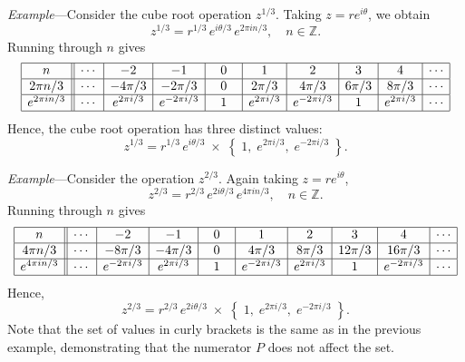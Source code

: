 \documentclass[10pt,a4paper]{article}
\begin{document}
\begin{framed} \noindent
  \textit{Example}---Consider the cube root operation $z^{1/3}$.
  Taking $z = r e^{i\theta}$, we obtain
\begin{equation}
z^{1/3} = r^{1/3} \, e^{i\theta/3} \, e^{2\pi i n/3}, \quad n \in \mathbb{Z}.
\end{equation}
Running through $n$ gives
\begin{align*}
  \begin{array}{|c||c|c|c|c|c|c|c|c|c|} \hline n &\cdots & -2 & -1 & 0 & 1 & 2 & 3 & 4 & \cdots \\ \hline 2\pi n / 3 &\cdots & -4\pi/3 & -2\pi/3 & 0 & 2\pi/3 & 4\pi/3 & 6\pi/3 & 8\pi/3 & \cdots \\ \hline e^{2\pi i n/3} &\cdots & e^{2\pi i /3} & e^{-2\pi i /3} & \;\,\;1\;\,\; & e^{2\pi i /3} & e^{-2\pi i /3} & \;\,\;1\;\,\; & e^{2\pi i /3} & \cdots \\ \hline \end{array}
\end{align*}
Hence, the cube root operation has three distinct values:
\begin{equation}
  z^{1/3} = r^{1/3} \, e^{i\theta/3} \;\times\; \left\{\;
  1, \;e^{2\pi i /3},\; e^{-2\pi i /3}\; \right\}.
\end{equation}
\end{framed}


\begin{framed} \noindent
  \textit{Example}---Consider the operation $z^{2/3}$. Again taking
  $z = re^{i\theta}$,
\begin{equation}
  z^{2/3} = r^{2/3} \, e^{2i\theta/3} \, e^{4\pi i n/3}, \quad n \in \mathbb{Z}.
\end{equation}
Running through $n$ gives
\begin{align*}
  \begin{array}{|c||c|c|c|c|c|c|c|c|c|} \hline n &\cdots & -2 & -1 & 0 & 1 & 2 & 3 & 4 & \cdots \\ \hline 4\pi n / 3 &\cdots & -8\pi/3 & -4\pi/3 & 0 & 4\pi/3 & 8\pi/3 & 12\pi/3 & 16\pi/3 & \cdots \\ \hline e^{4\pi i n/3} &\cdots & e^{-2\pi i /3} & e^{2\pi i /3} & \;\,\;1\;\,\; & e^{-2\pi i /3} & e^{2\pi i /3} & \;\,\;1\;\,\; & e^{-2\pi i /3} & \cdots \\ \hline \end{array}
\end{align*}
Hence,
\begin{equation}
z^{2/3} = r^{2/3} \, e^{2i\theta/3} \;\times\; \left\{\;1,\; e^{2\pi i /3},\; e^{-2\pi i /3}\;\right\}.
\end{equation}
Note that the set of values in curly brackets is the same as in the
previous example, demonstrating that the numerator $P$ does not affect
the set.
\end{framed}
\end{document}
